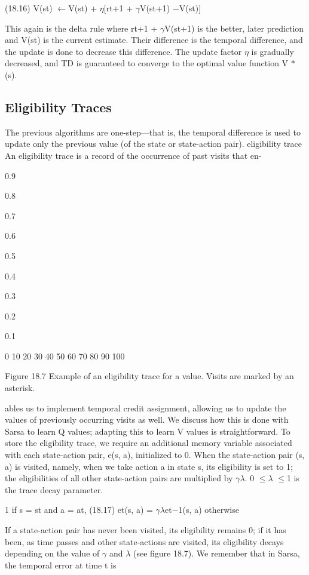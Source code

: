 (18.16) V(st) $\leftarrow$V(st) + $\eta$[rt+1 + $\gamma$V(st+1) $-$V(st)]

This again is the delta rule where rt+1 + $\gamma$V(st+1) is the better, later prediction and V(st) is the current estimate. Their difference is the temporal difference, and the update is done to decrease this difference. The update factor $\eta$ is gradually decreased, and TD is guaranteed to converge to the optimal value function V $*$(s).

\subsection{Eligibility Traces}

The previous algorithms are one-step---that is, the temporal difference is used to update only the previous value (of the state or state-action pair). eligibility trace An eligibility trace is a record of the occurrence of past visits that en-

0.9

0.8

0.7

0.6

0.5

0.4

0.3

0.2

0.1

0 10 20 30 40 50 60 70 80 90 100

Figure 18.7 Example of an eligibility trace for a value. Visits are marked by an asterisk.

ables us to implement temporal credit assignment, allowing us to update the values of previously occurring visits as well. We discuss how this is done with Sarsa to learn Q values; adapting this to learn V values is straightforward. To store the eligibility trace, we require an additional memory variable associated with each state-action pair, e(s, a), initialized to 0. When the state-action pair (s, a) is visited, namely, when we take action a in state s, its eligibility is set to 1; the eligibilities of all other state-action pairs are multiplied by $\gamma$$\lambda$. 0 $\leq$$\lambda$ $\leq$1 is the trace decay parameter.

1 if s = st and a = at, (18.17) et(s, a) = $\gamma$$\lambda$et$-$1(s, a) otherwise

If a state-action pair has never been visited, its eligibility remains 0; if it has been, as time passes and other state-actions are visited, its eligibility decays depending on the value of $\gamma$ and $\lambda$ (see figure 18.7). We remember that in Sarsa, the temporal error at time t is

